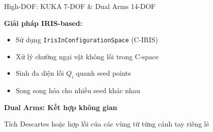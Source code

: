 \documentclass[aspectratio=169]{beamer}
\begin{document}
\begin{frame}{High-DOF: KUKA 7-DOF \& Dual Arms 14-DOF}

    \textbf{Giải pháp IRIS-based:}
    \begin{itemize}
        \item Sử dụng \texttt{IrisInConfigurationSpace} (C-IRIS)
        \item Xử lý chướng ngại vật không lồi trong C-space
        \item Sinh đa diện lồi $Q_i$ quanh seed points
        \item Song song hóa cho nhiều seed khác nhau
    \end{itemize}

    \vspace{1em}
    \textbf{Dual Arms: Kết hợp không gian}
    
    Tích Descartes hoặc hợp lồi của các vùng từ từng cánh tay riêng lẻ

\end{frame}




\end{document}
